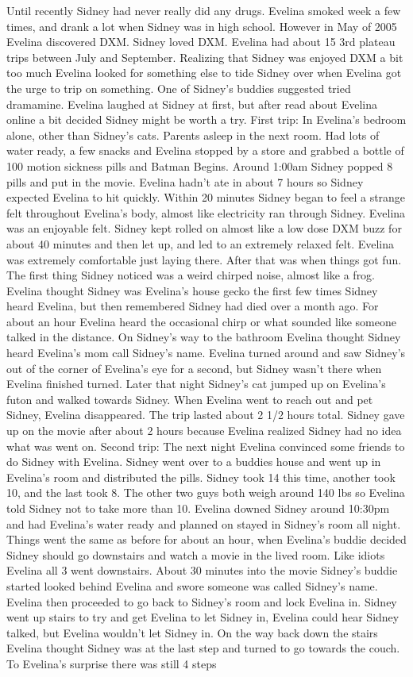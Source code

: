 \documentclass[12pt]{book}
\begin{document}
Until recently Sidney had never really did any drugs. Evelina smoked week a few times, and drank a lot when Sidney was in high school. However in May of 2005 Evelina discovered DXM. Sidney loved DXM. Evelina had about 15 3rd plateau trips between July and September. Realizing that Sidney was enjoyed DXM a bit too much Evelina looked for something else to tide Sidney over when Evelina got the urge to trip on something. One of Sidney's buddies suggested tried dramamine. Evelina laughed at Sidney at first, but after read about Evelina online a bit decided Sidney might be worth a try. First trip: In Evelina's bedroom alone, other than Sidney's cats. Parents asleep in the next room. Had lots of water ready, a few snacks and Evelina stopped by a store and grabbed a bottle of 100 motion sickness pills and Batman Begins. Around 1:00am Sidney popped 8 pills and put in the movie. Evelina hadn't ate in about 7 hours so Sidney expected Evelina to hit quickly. Within 20 minutes Sidney began to feel a strange felt throughout Evelina's body, almost like electricity ran through Sidney. Evelina was an enjoyable felt. Sidney kept rolled on almost like a low dose DXM buzz for about 40 minutes and then let up, and led to an extremely relaxed felt. Evelina was extremely comfortable just laying there. After that was when things got fun. The first thing Sidney noticed was a weird chirped noise, almost like a frog. Evelina thought Sidney was Evelina's house gecko the first few times Sidney heard Evelina, but then remembered Sidney had died over a month ago. For about an hour Evelina heard the occasional chirp or what sounded like someone talked in the distance. On Sidney's way to the bathroom Evelina thought Sidney heard Evelina's mom call Sidney's name. Evelina turned around and saw Sidney's out of the corner of Evelina's eye for a second, but Sidney wasn't there when Evelina finished turned. Later that night Sidney's cat jumped up on Evelina's futon and walked towards Sidney. When Evelina went to reach out and pet Sidney, Evelina disappeared. The trip lasted about 2 1/2 hours total. Sidney gave up on the movie after about 2 hours because Evelina realized Sidney had no idea what was went on. Second trip: The next night Evelina convinced some friends to do Sidney with Evelina. Sidney went over to a buddies house and went up in Evelina's room and distributed the pills. Sidney took 14 this time, another took 10, and the last took 8. The other two guys both weigh around 140 lbs so Evelina told Sidney not to take more than 10. Evelina downed Sidney around 10:30pm and had Evelina's water ready and planned on stayed in Sidney's room all night. Things went the same as before for about an hour, when Evelina's buddie decided Sidney should go downstairs and watch a movie in the lived room. Like idiots Evelina all 3 went downstairs. About 30 minutes into the movie Sidney's buddie started looked behind Evelina and swore someone was called Sidney's name. Evelina then proceeded to go back to Sidney's room and lock Evelina in. Sidney went up stairs to try and get Evelina to let Sidney in, Evelina could hear Sidney talked, but Evelina wouldn't let Sidney in. On the way back down the stairs Evelina thought Sidney was at the last step and turned to go towards the couch. To Evelina's surprise there was still 4 steps 
\end{document}
